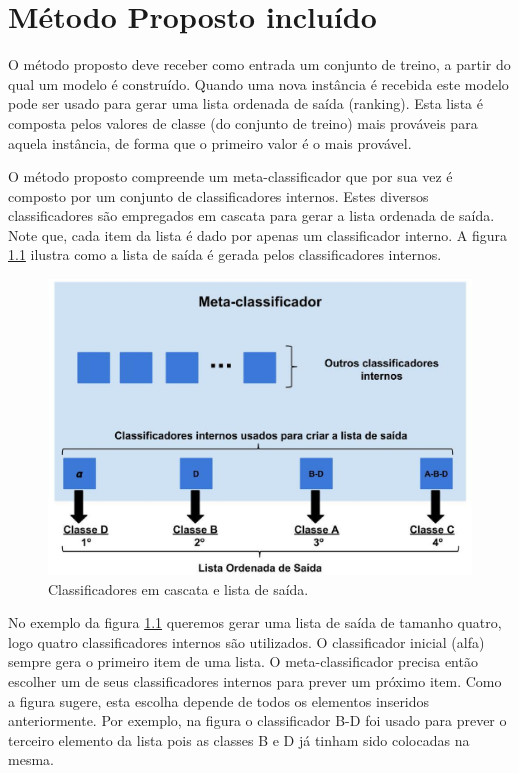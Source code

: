 \chapter{Método Proposto incluído}

O método proposto deve receber como entrada um conjunto de treino, a partir do qual um modelo é construído. Quando uma nova instância é recebida este modelo pode ser usado para gerar uma lista ordenada de saída (ranking). Esta lista é composta pelos valores de classe (do conjunto de treino) mais prováveis para aquela instância, de forma que o primeiro valor é o mais provável. 

O método proposto compreende um meta-classificador que por sua vez é composto por um conjunto de classificadores internos. Estes diversos classificadores são empregados em cascata para gerar a lista ordenada de saída. Note que, cada item da lista é dado por apenas um classificador interno. A figura \ref{fig:metodoproposto01} ilustra como a lista de saída é gerada pelos classificadores internos.

\begin{figure}[h!]
  \includegraphics[width=\linewidth]{images/metodoproposto01.eps}
  \caption{Classificadores em cascata e lista de saída.}
  \label{fig:metodoproposto01}
\end{figure}

No exemplo da figura \ref{fig:metodoproposto01} queremos gerar uma lista de saída de tamanho quatro, logo quatro classificadores internos são utilizados. O classificador inicial (alfa) sempre gera o primeiro item de uma lista. O meta-classificador precisa então escolher um de seus classificadores internos para prever um próximo item. Como a figura sugere, esta escolha depende de todos os elementos inseridos anteriormente. Por exemplo, na figura o classificador B-D foi usado para prever o terceiro elemento da lista pois as classes B e D já tinham sido colocadas na mesma.

